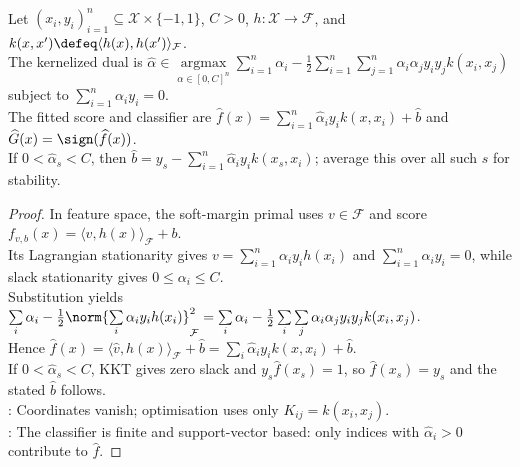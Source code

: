 \begin{method} \label{meth:sl-kernelized-svm-classifier} \\
Let $(x_i,y_i)_{i=1}^n\subseteq\mathcal{X}\times\{-1,1\}$, $C>0$, $h:\mathcal{X}\to\mathcal{F}$, and $k(x,x')\defeq\langle h(x),h(x')\rangle_{\mathcal{F}}$.\\
The kernelized dual is $\widehat{\alpha}\in\operatorname*{argmax}\limits_{\alpha\in[0,C]^n}\sum\limits_{i=1}^n\alpha_i-\frac12\sum\limits_{i=1}^n\sum\limits_{j=1}^n\alpha_i\alpha_jy_iy_jk(x_i,x_j)$ subject to $\sum\limits_{i=1}^n\alpha_i y_i=0$.\\
The fitted score and classifier are $\widehat{f}(x)=\sum\limits_{i=1}^n\widehat{\alpha}_iy_ik(x,x_i)+\widehat{b}$ and $\widehat{G}(x)=\sign(\widehat{f}(x))$.\\
If $0<\widehat{\alpha}_s<C$, then $\widehat{b}=y_s-\sum\limits_{i=1}^n\widehat{\alpha}_iy_ik(x_s,x_i)$; average this over all such $s$ for stability.
\end{method}
\begin{proof}
In feature space, the soft-margin primal uses $v\in\mathcal{F}$ and score $f_{v,b}(x)=\langle v,h(x)\rangle_{\mathcal{F}}+b$.\\
Its Lagrangian stationarity gives $v=\sum\limits_{i=1}^n\alpha_i y_i h(x_i)$ and $\sum\limits_{i=1}^n\alpha_i y_i=0$, while slack stationarity gives $0\leq\alpha_i\leq C$.\\
Substitution yields $\sum\limits_i\alpha_i-\frac12\norm{\sum\limits_i\alpha_i y_i h(x_i)}_{\mathcal{F}}^2=\sum\limits_i\alpha_i-\frac12\sum\limits_i\sum\limits_j\alpha_i\alpha_jy_iy_jk(x_i,x_j)$.\\
Hence $\widehat{f}(x)=\langle\widehat{v},h(x)\rangle_{\mathcal{F}}+\widehat{b}=\sum\limits_i\widehat{\alpha}_iy_ik(x,x_i)+\widehat{b}$.\\
If $0<\widehat{\alpha}_s<C$, KKT gives zero slack and $y_s\widehat{f}(x_s)=1$, so $\widehat{f}(x_s)=y_s$ and the stated $\widehat{b}$ follows.\\
: Coordinates vanish; optimisation uses only $K_{ij}=k(x_i,x_j)$.\\
: The classifier is finite and support-vector based: only indices with $\widehat{\alpha}_i>0$ contribute to $\widehat{f}$.
\end{proof}

